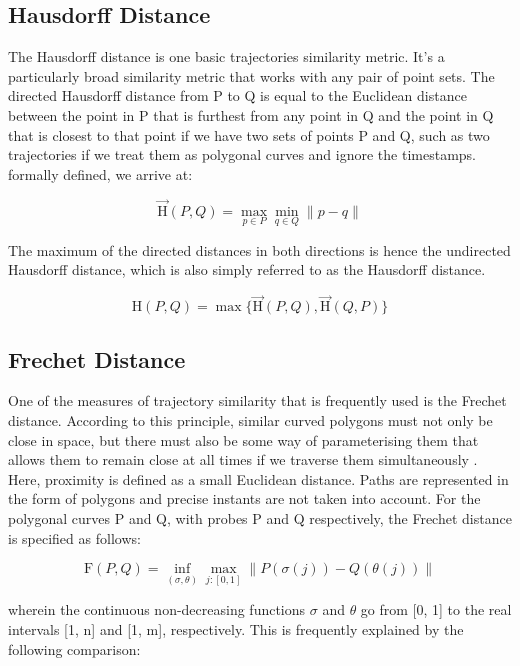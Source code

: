 \subsection{Hausdorff Distance}


The Hausdorff distance is one basic trajectories similarity metric. It's a particularly broad similarity metric that works with any pair of point sets. The directed Hausdorff distance from P to Q is equal to the Euclidean distance between the point in P that is furthest from any point in Q and the point in Q that is closest to that point \cite{kerkhof2022algorithmic} if we have two sets of points P and Q, such as two trajectories if we treat them as polygonal curves and ignore the timestamps. formally defined, we arrive at:

$$\overrightarrow{\mathrm{H}}(P, Q)=\max _{p \in P} \min _{q \in Q} \| p-q \| $$

The maximum of the directed distances in both directions is hence the undirected Hausdorff distance, which is also simply referred to as the Hausdorff distance.

$$\mathrm{H}(P, Q)=\max \{\overrightarrow{\mathrm{H}}(P, Q), \overrightarrow{\mathrm{H}}(Q, P)\} $$


\subsection{Frechet Distance}


One of the measures of trajectory similarity that is frequently used is the Frechet distance. According to this principle, similar curved polygons must not only be close in space, but there must also be some way of parameterising them that allows them to remain close at all times if we traverse them simultaneously \cite{kerkhof2022algorithmic}. Here, proximity is defined as a small Euclidean distance. Paths are represented in the form of polygons and precise instants are not taken into account. For the polygonal curves P and Q, with probes P and Q respectively, the Frechet distance is specified as follows:

$$\mathrm{F}(P, Q)=\inf _{(\sigma, \theta)} \max _{j:[0,1]}\|P(\sigma(j))-Q(\theta(j))\| $$

wherein the continuous non-decreasing functions $\sigma$ and $\theta$ go from [0, 1] to the real intervals [1, n] and [1, m], respectively. This is frequently explained by the following comparison: \\

